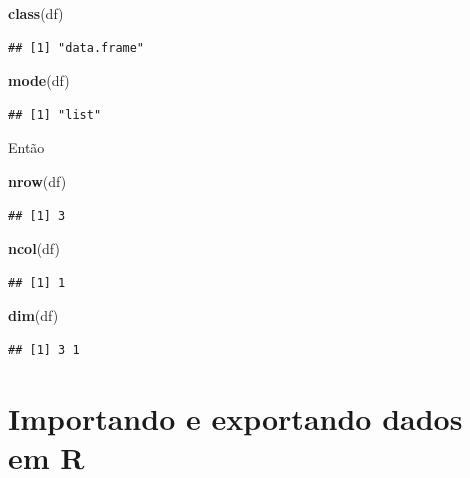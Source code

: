 \documentclass[]{book}
\newenvironment{Shaded}{\begin{snugshade}}{\end{snugshade}}
\newcommand{\KeywordTok}[1]{\textcolor[rgb]{0.13,0.29,0.53}{\textbf{#1}}}
\newcommand{\NormalTok}[1]{#1}
\begin{document}
\begin{Shaded}
\begin{Highlighting}[]
\KeywordTok{class}\NormalTok{(df)}
\end{Highlighting}
\end{Shaded}

\begin{verbatim}
## [1] "data.frame"
\end{verbatim}

\begin{Shaded}
\begin{Highlighting}[]
\KeywordTok{mode}\NormalTok{(df)}
\end{Highlighting}
\end{Shaded}

\begin{verbatim}
## [1] "list"
\end{verbatim}

Então

\begin{Shaded}
\begin{Highlighting}[]
\KeywordTok{nrow}\NormalTok{(df)}
\end{Highlighting}
\end{Shaded}

\begin{verbatim}
## [1] 3
\end{verbatim}

\begin{Shaded}
\begin{Highlighting}[]
\KeywordTok{ncol}\NormalTok{(df)}
\end{Highlighting}
\end{Shaded}

\begin{verbatim}
## [1] 1
\end{verbatim}

\begin{Shaded}
\begin{Highlighting}[]
\KeywordTok{dim}\NormalTok{(df)}
\end{Highlighting}
\end{Shaded}

\begin{verbatim}
## [1] 3 1
\end{verbatim}

\chapter{Importando e exportando dados em
R}\label{importando-e-exportando-dados-em-r}
\end{document}
